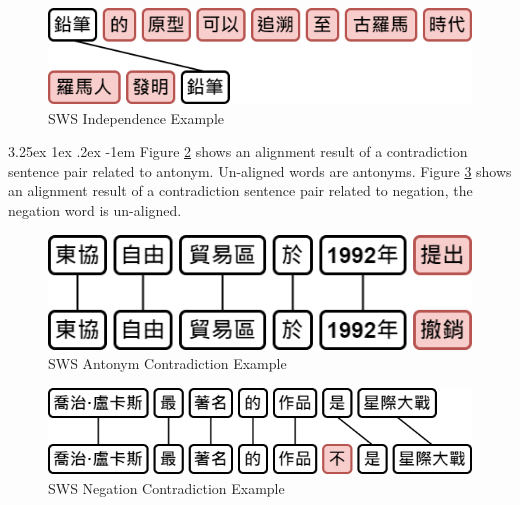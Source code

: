 \documentclass[12pt]{article}
\makeatletter
\renewcommand\paragraph{\@startsection{paragraph}{5}{\z@}%
  {3.25ex \@plus1ex \@minus.2ex}%
  {-1em}%
  {\normalfont\normalsize\bfseries}}
\makeatother
\begin{document}
\begin{CJK*}{UTF8}{bkai}
\begin{spacing}{1.77}
\hspace*{-1.5in}
\begin{figure}[H]
  \centering
  \includegraphics[scale=0.6]{SWS.I.png}
  \caption{SWS Independence Example}
  \label{fig:sws_i}
\end{figure}

\paragraph{}
Figure \ref{fig:sws_c_antonym} shows an alignment result of a contradiction sentence pair related to antonym. Un-aligned words are antonyms. Figure \ref{fig:sws_c_neg} shows an alignment result of a contradiction sentence pair related to negation, the negation word is un-aligned.

\hspace*{-1.5in}
\begin{figure}[H]
  \centering
  \includegraphics[scale=0.6]{SWS.C.Antonym}
  \caption{SWS Antonym Contradiction Example}
  \label{fig:sws_c_antonym}
\end{figure}

\begin{figure}[H]
  \centering
  \includegraphics[scale=0.6]{SWS.C.Negation.png}
  \caption{SWS Negation Contradiction Example}
  \label{fig:sws_c_neg}
\end{figure}


\end{spacing}
\end{CJK*}
\end{document}
